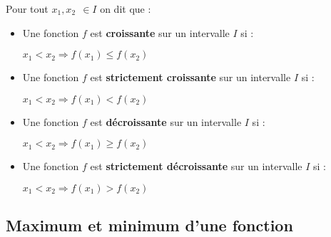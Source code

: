 \documentclass[12pt, a4paper]{book}
\begin{document}
Pour tout $ x_1, x_2\ \ \in I$ on dit que :
\begin{itemize}
    \item  Une fonction $f$ est \textbf{croissante} sur un intervalle $I$ si :
    \begin{center}
        $x_1 < x_2 \Rightarrow f(x_1) \leq f(x_2)$
    \end{center}
    

    \item  Une fonction $f$ est \textbf{strictement croissante} sur un intervalle $I$ si :
    \begin{center}
        $x_1 < x_2 \Rightarrow f(x_1) < f(x_2)$
    \end{center}
   

    \item  Une fonction $f$ est \textbf{décroissante} sur un intervalle $I$ si :
    \begin{center}
        $x_1 < x_2 \Rightarrow f(x_1) \geq f(x_2)$
    \end{center}
   

    \item  Une fonction $f$ est \textbf{strictement décroissante} sur un intervalle $I$ si :
    \begin{center}
        $x_1 < x_2 \Rightarrow f(x_1) > f(x_2)$
    \end{center}
    
\end{itemize}
\newpage

\subsection{Maximum et minimum d'une fonction}
\end{document}
